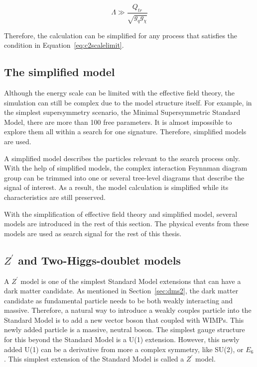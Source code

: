 \begin{equation}
  \Lambda \gg \frac{Q_{tr}}{\sqrt{g_{q}g_{\chi}}}
  \label{eq:c2scalelimit}
\end{equation}

Therefore, the calculation can be simplified for any process that satisfies the condition in Equation~\ref{eq:c2scalelimit}.

\subsection{The simplified model}
\par Although the energy scale can be limited with the effective field theory, the simulation can still be complex due to the model structure itself. For example, in the simplest supersymmetry scenario, the Minimal Supersymmetric Standard Model, there are more than 100 free parameters. It is almost impossible to explore them all within a search for one signature. Therefore, simplified models\cite{SimplifiedModels-Alves2012} are used.

\par A simplified model describes the particles relevant to the search process only. With the help of simplified models, the complex interaction Feynnman diagram group can be trimmed into one or several tree-level diagrams that describe the signal of interest. As a result, the model calculation is simplified while its characteristics are still preserved. 

\par With the simplification of effective field theory and simplified model, several models are introduced in the rest of this section. The physical events from these models are used as search signal for the rest of this thesis.

\subsection{$Z^{\prime}$ and Two-Higgs-doublet models}
\par A $Z^{\prime}$ model\cite{He:1991qd} is one of the simplest Standard Model extensions that can have a dark matter candidate. As mentioned in Section~\ref{sec:dms2}, the dark matter candidate as fundamental particle needs to be both weakly interacting and massive. Therefore, a natural way to introduce a weakly couples particle into the Standard Model is to add a new vector boson that coupled with WIMPs. This newly added particle is a massive, neutral boson. The simplest gauge structure for this beyond the Standard Model is a U(1) extension. However, this newly added U(1) can be a derivative from more a complex symmetry, like SU(2), or $E_{6}$. This simplest extension of the Standard Model is called a $Z^{\prime}$ model.

